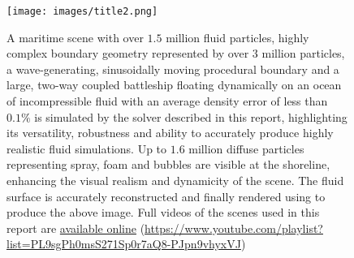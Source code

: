 \documentclass[oneside, a4paper]{book}
\begin{document}
\begin{figure}
  \centering
  \texttt{[image: images/title2.png]}
  \caption{A maritime scene with over $1.5$ million fluid particles, highly complex boundary geometry represented by over $3$ million particles, a wave-generating, sinusoidally moving procedural boundary and a large, two-way coupled battleship floating dynamically on an ocean of incompressible fluid with an average density error of less than $0.1\%$ is simulated by the solver described in this report, highlighting its versatility, robustness and ability to accurately produce highly realistic fluid simulations. Up to $1.6$ million diffuse particles representing spray, foam and bubbles are visible at the shoreline, enhancing the visual realism and dynamicity of the scene. The fluid surface is accurately reconstructed and finally rendered using \autocite[Blender]{blender} to produce the above image. Full videos of the scenes used in this report are \href{https://www.youtube.com/playlist?list=PL9sgPh0msS271Sp0r7aQ8-PJpn9vhyxVJ}{available online} (\url{https://www.youtube.com/playlist?list=PL9sgPh0msS271Sp0r7aQ8-PJpn9vhyxVJ})}
  \label{fig:title-image}
\end{figure}
\end{document}
